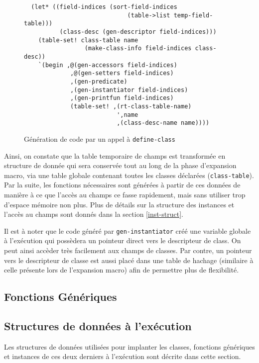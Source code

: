 \documentclass[letterpaper,12pt]{book}
\begin{document}
      \begin{figure}[h!]
        \begin{lstlisting}
  (let* ((field-indices (sort-field-indices
                             (table->list temp-field-table)))
          (class-desc (gen-descriptor field-indices)))
    (table-set! class-table name 
                 (make-class-info field-indices class-desc))
    `(begin ,@(gen-accessors field-indices)
             ,@(gen-setters field-indices)
             ,(gen-predicate)
             ,(gen-instantiator field-indices)
             ,(gen-printfun field-indices)
             (table-set! ,(rt-class-table-name)
                          ',name
                          ,(class-desc-name name))))
        \end{lstlisting}
        \caption{Génération de code par un appel à \texttt{define-class}}
        \label{class-code-gen}
      \end{figure}

      Ainsi, on constate que la table temporaire de champs est
      transformée en structure de donnée qui sera conservée tout au
      long de la phase d'expansion macro, via une table globale
      contenant toutes les classes déclarées
      (\texttt{class-table}). Par la suite, les fonctions nécessaires
      sont générées à partir de ces données de manière à ce que
      l'accès au champs ce fasse rapidement, mais sans utiliser trop
      d'espace mémoire non plus. Plus de détails sur la structure des
      instances et l'accès au champs sont donnés dans la section
      \ref{inst-struct}.

      Il est à noter que le code généré par \texttt{gen-instantiator}
      créé une variable globale à l'exécution qui possèdera un
      pointeur direct vers le descripteur de class. On peut ainsi
      accèder très facilement aux champs de classes. Par contre, un
      pointeur vers le descripteur de classe est aussi placé dans une
      table de hachage (similaire à celle présente lors de l'expansion
      macro) afin de permettre plus de flexibilité.
  
  \subsection{Fonctions Génériques}

  \subsection{Structures de données à l'exécution}
    Les structures de données utilisées pour implanter les classes,
    fonctions génériques et instances de ces deux derniers à
    l'exécution sont décrite dans cette section.
  
\end{document}
